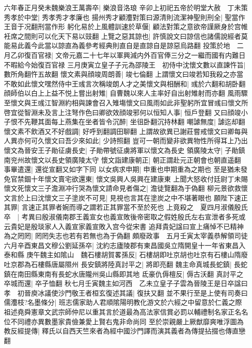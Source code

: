 六年春正月癸未魏樂浪王萬壽卒|{
	樂浪音洛琅}
辛卯上初祀五帝於明堂大赦　丁未策秀孝於中堂|{
	秀孝秀才孝廉也}
揚州秀才顧灋對策曰源清則流潔神聖則刑全|{
	聖當作王音于况翻刑當作形}
躬化易於上風體訓速於草偃|{
	顧法對策之意欲帝謹厥身於宫帷衽席之間則可以化天下易以豉翻}
上覽之惡其諒也|{
	許慎說文曰諒信也諸儒說經者莫能易此義今此當以諒直為義參考經典則直自是直諒自是諒惡烏路翻}
投策於地　二月乙卯復百官禄|{
	文帝元嘉二十七年以軍興減内外百官俸三分之一繼而國有内難日不暇給今始復百官禄}
三月庚寅立皇子子元為邵陵王　初侍中沈懷文數以直諫忤旨|{
	數所角翻忤五故翻}
懷文素與顔竣周朗善|{
	竣七倫翻}
上謂懷文曰竣若知我殺之亦當不敢如此懷文嘿然侍中王彧言次稱竣朗人才之美懷文與相酬和|{
	彧於六翻和胡卧翻}
顔師伯以白上上益不悦上嘗出射雉|{
	自曹魏以來人主率好自出射雉射而亦翻}
風雨驟至懷文與王彧江智淵約相與諫會召入雉塲懷文曰風雨如此非聖躬所宜冒彧曰懷文所啓宜從智淵未及言上注弩作色曰卿欲效顔竣邪何以恒知人事|{
	恒戶登翻}
又曰顔竣小子恨不先鞭其面每上燕集在坐者皆令沉醉|{
	坐徂卧翻沉持林翻}
嘲謔無度|{
	謔迄却翻}
懷文素不飲酒又不好戲調|{
	好呼到翻調田聊翻}
上謂故欲異已謝莊嘗戒懷文曰卿每與人異亦何可久懷文曰吾少來如此|{
	少詩照翻}
豈可一朝而變非欲異物性所得耳上乃出懷文為晉安王子勛征虜長史|{
	子勛帶號征虜將軍以懷文為長史}
領廣陵太守|{
	子勛鎮南兖州故懷文以長史領廣陵太守}
懷文詣建康朝正|{
	朝正謂赴元正朝會也朝直遥翻}
事畢遣還|{
	還從宣翻又如字下同}
以女病求申期|{
	申重也申期重為之期也}
至是猶未發免官禁錮十年懷文賣宅欲還東|{
	懷文吳興人吳興在建康東}
上聞大怒收付廷尉丁未賜懷文死懷文三子澹淵冲行哭為懷文請命見者傷之|{
	澹徒覽翻為于偽翻}
柳元景欲救懷文言於上曰沈懷文三子塗炭不可見|{
	見視也言其在塗炭之中不堪著眼也}
願陛下速正其罪|{
	言速正其罪者婉而導之謂若正其罪當不至於死也}
上竟殺之　夏四月淑儀殷氏卒　|{
	考異曰殷淑儀南郡王義宣女也義宣敗後帝密取之假姓殷氏左右宣泄者多死或云貴妃是殷琰家人入義宣家義宣敗入宫今從宋書}
追拜貴妃諡曰宣上痛悼不已精神為之罔罔|{
	罔罔失志也若有若無也為于偽翻}
頗廢政事　五月壬寅太宰義恭解領司徒　六月辛酉東昌文穆公劉延孫卒|{
	沈約志廬陵郡有東昌國吳立隋開皇十一年省東昌入泰和縣}
庚午魏主如隂山　魏石樓胡賀畧孫反|{
	石樓胡即吐京胡也吐京有石樓山隋廢吐京郡為石樓縣唐屬隰州}
長安鎮將陸真討平之|{
	將即亮翻}
魏主命真城長蛇鎮|{
	長蛇鎮在南田縣東南有長蛇水唐隴州吳山縣即其地}
氐豪仇傉檀反|{
	傉古沃翻}
真討平之卒城而還|{
	卒子恤翻}
秋七月壬寅魏主如河西　乙未立皇子子雲為晉陵王是日卒諡曰孝　初晉庾冰議使沙門敬王者桓玄復述其議|{
	復扶又翻}
並不果行至是上使有司奏曰儒灋枝?名墨條分|{
	班志儒家助人君順隂陽明教化游文於六經之中留意於仁義之際祖述堯舜憲章文武宗師仲尼以重其言於道最為高法家信賞必罰以輔禮制名家正名名位不同禮亦異數墨家貴儉兼愛上賢右鬼非命尚同}
至於崇親嚴上厥猷靡爽唯浮圖為教反經提傳|{
	釋氏以自西天竺來者為經中國沙門譯而演其義者為傳提拈掇也傳直戀翻}
